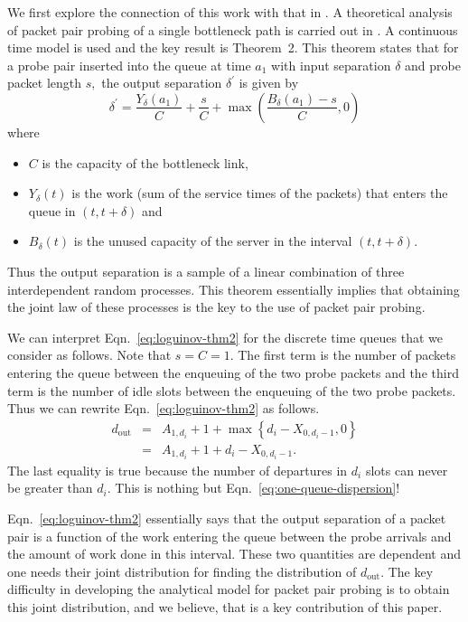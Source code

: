 \documentclass[11pt]{article}
\begin{document}
We first explore the connection of this work with that in
\cite{Liu05,Liu07}. A theoretical analysis of packet pair probing of a
single bottleneck path is carried out in \cite{Liu05}. A continuous
time model is used and the key result is Theorem~2. This theorem
states that for a probe pair inserted into the queue at time $a_1$
with input separation $\delta$ and probe packet length $s,$ the output
separation $\delta^\prime$ is given by
\begin{equation}
  \delta^\prime  =  \frac{Y_\delta(a_1)}{C} + \frac{s}{C} +
  \max \left( \frac{B_\delta(a_1)  -s }{C}, 0 \right)
  \label{eq:loguinov-thm2}
\end{equation}
where  
\begin{itemize}
\item $C$ is the capacity of the bottleneck link,
\item $Y_\delta(t)$ is the work (sum of the service times of the
  packets) that enters the queue in $(t, t+\delta)$ and 
\item $B_\delta(t)$ is the unused capacity of the server in the
  interval $(t, t+\delta).$ 
\end{itemize}
Thus the output separation is a sample of a linear combination of
three interdependent random processes. This theorem essentially
implies that obtaining the joint law of these processes is the key to
the use of packet pair probing.

We can interpret Eqn.~\ref{eq:loguinov-thm2} for the discrete time
queues that we consider as follows. Note that $s=C=1.$ The first term
is the number of packets entering the queue between the enqueuing of
the two probe packets and the third term is the number of idle slots
between the enqueuing of the two probe packets. Thus we can rewrite
Eqn.~\ref{eq:loguinov-thm2} as follows.
\begin{eqnarray*}
  d_{\mathrm{out}} &=& A_{1,d_i} + 1 + \max \left\{ d_i - X_{0, d_i-1}, 0
\right\}\\   
&=& A_{1,d_i} + 1 + d_i - X_{0, d_i-1} .
\end{eqnarray*}
The last equality is true because the number of departures in $d_i$
slots can never be greater than $d_i.$ This is nothing but
Eqn.~\ref{eq:one-queue-dispersion}!

Eqn.~\ref{eq:loguinov-thm2} essentially says that the output
separation of a packet pair is a function of the work entering the
queue between the probe arrivals and the amount of work done in this
interval. These two quantities are dependent and one needs their joint
distribution for finding the distribution of $d_{\mathrm{out}}.$ The
key difficulty in developing the analytical model for packet pair
probing is to obtain this joint distribution, and we believe, that is
a key contribution of this paper.
\end{document}
